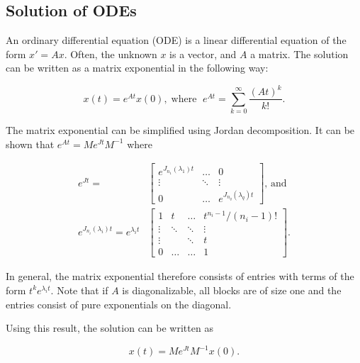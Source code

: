 \documentclass[../main.tex]{subfiles}
\begin{document}
\subsection{Solution of ODEs}
An ordinary differential equation (ODE) is a linear differential equation of the form $x'=Ax$. Often, the unknown $x$ is a vector, and $A$ a matrix. The solution can be written as a matrix exponential in the following way:

\begin{equation}
    x(t) = e^{At}x(0), \;\text{where } \;e^{At} = \sum_{k=0}^{\infty}\frac{(At)^k}{k!}.
\end{equation}

The matrix exponential can be simplified using Jordan decomposition. It can be shown that  $e^{At} = Me^{Jt}M^{-1}$ where 

\begin{equation}
    \begin{aligned}
        e^{Jt} = &\begin{bmatrix}e^{J_{n_1}(\lambda_1)t} & \dots & 0 \\
                                                         \vdots & \ddots & \vdots \\
                                                         0 & \dots &  e^{J_{n_q}(\lambda_q)t}\end{bmatrix} \text{, and } \\
            e^{J_{n_i}(\lambda_i)t} = e^{\lambda_it} &\begin{bmatrix} 1 & t & \dots & t^{n_i-1}/(n_i-1)! \\
                                                                \vdots  & \ddots & \ddots & \vdots \\
                                                                \vdots & & \ddots& t \\
                                                            0 & \dots & \dots & 1\ \end{bmatrix}.
    \end{aligned}
\end{equation}

In general, the matrix exponential therefore consists of entries with terms of the form $t^ke^{\lambda_it}$. Note that if $A$ is diagonalizable, all blocks are of size one and the entries consist of pure exponentials on the diagonal. 

Using this result, the solution can be written as 

\begin{equation}\label{jordanode}
    x(t) = Me^{Jt}M^{-1}x(0).
\end{equation}
\end{document}
